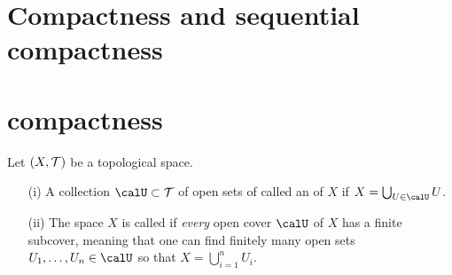 \section{Compactness and sequential compactness}
\label{compactness}
\section{compactness}
\begin{defn}
  Let $(X,\mathcal{T})$ be a topological space.
  \begin{itemize}
    \item[(i)] A collection $\calU \subset \calT$ of open sets of called an  of $X$ if $X = \bigcup_{U \in \calU} U$.
    \item[(ii)] The space $X$ is called  if \emph{every} open cover $\calU$ of $X$ has a finite subcover, meaning that one can find finitely many open sets $U_1, \dots, U_n \in \calU$ so that $X = \bigcup_{i=1}^n U_i$.
  \end{itemize}
\end{defn}

